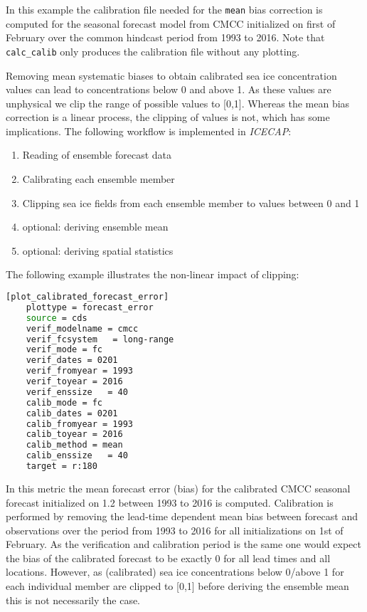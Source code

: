 \documentclass[DIV=10, parskip=full]{scrreprt}
\newcommand{\ice}{\textit{ICECAP}\xspace}
\begin{document}
In this example the calibration file needed for the \texttt{mean} bias correction is computed for the seasonal forecast model from CMCC initialized on first of February over the common hindcast period from 1993 to 2016. Note that \texttt{calc\_calib} only produces the calibration file without any plotting. 

Removing mean systematic biases to obtain calibrated sea ice concentration values can lead to concentrations below 0 and above 1. As these values are unphysical we clip the range of possible values to [0,1]. Whereas the mean bias correction is a linear process, the clipping of values is not, which has some implications. The following workflow is implemented in \ice: 
\begin{enumerate}
	\item Reading of ensemble forecast data
	\item Calibrating each ensemble member 
	\item Clipping sea ice fields from each ensemble member to values between 0 and 1
	\item optional: deriving ensemble mean
	\item optional: deriving spatial statistics
	\end{enumerate}

The following example illustrates the non-linear impact of clipping:

\begin{lstlisting}[language=bash]
	[plot_calibrated_forecast_error]
	plottype = forecast_error 
	source = cds
	verif_modelname = cmcc
	verif_fcsystem   = long-range
	verif_mode = fc
	verif_dates = 0201
	verif_fromyear = 1993
	verif_toyear = 2016
	verif_enssize   = 40
	calib_mode = fc
	calib_dates = 0201
	calib_fromyear = 1993
	calib_toyear = 2016
	calib_method = mean
	calib_enssize   = 40
	target = r:180
\end{lstlisting}

In this metric the mean forecast error (bias) for the calibrated CMCC seasonal forecast initialized on 1.2 between 1993 to 2016 is computed. Calibration is performed by removing the lead-time dependent mean bias between forecast and observations over the period from 1993 to 2016 for all initializations on 1st of February. As the verification and calibration period is the same one would expect the bias of the calibrated forecast to be exactly 0 for all lead times and all locations. However, as (calibrated) sea ice concentrations below 0/above 1 for each individual member are clipped to [0,1] before deriving the ensemble mean this is not necessarily the case.  
\end{document}
